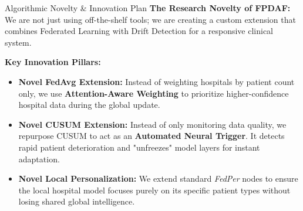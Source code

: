 \documentclass[aspectratio=169, 11pt]{beamer}
\begin{document}
\begin{frame}{Algorithmic Novelty \& Innovation Plan}
    \textbf{The Research Novelty of FPDAF:}
    We are not just using off-the-shelf tools; we are creating a custom extension that combines Federated Learning with Drift Detection for a responsive clinical system.
    
    \vspace{0.3cm}
    \textbf{Key Innovation Pillars:}
    \begin{itemize}
        \item \textbf{Novel FedAvg Extension:} Instead of weighting hospitals by patient count only, we use \textbf{Attention-Aware Weighting} to prioritize higher-confidence hospital data during the global update.
        \item \textbf{Novel CUSUM Extension:} Instead of only monitoring data quality, we repurpose CUSUM to act as an \textbf{Automated Neural Trigger}. It detects rapid patient deterioration and "unfreezes" model layers for instant adaptation.
        \item \textbf{Novel Local Personalization:} We extend standard \textit{FedPer} nodes to ensure the local hospital model focuses purely on its specific patient types without losing shared global intelligence.
    \end{itemize}
\end{frame}
\end{document}
